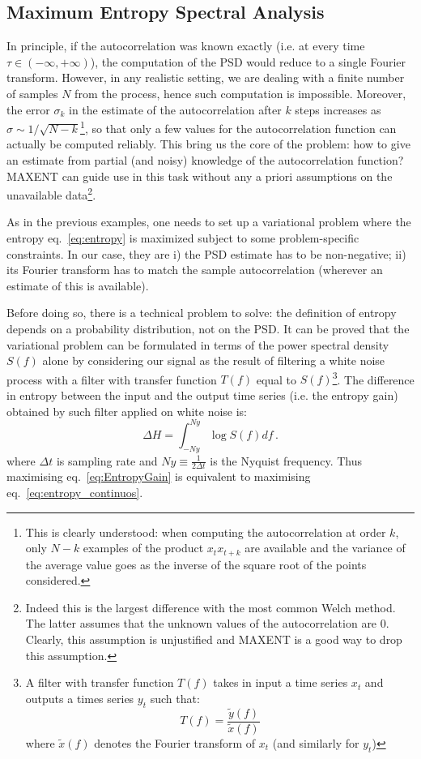 \documentclass[twocolumn,showpacs,preprintnumbers,nofootinbib,prd,
superscriptaddress,10pt]{revtex4-1}
\begin{document}
\subsection{Maximum Entropy Spectral Analysis} \label{sec:MESA}

In principle, if the autocorrelation was known exactly (i.e. at every time $\tau \in (-\infty,+\infty)$), the computation of the PSD 
would reduce to a single Fourier transform.
However, in any realistic setting, we are dealing with a finite number of samples $N$ from the process, hence such computation
is impossible.
Moreover, the error $\sigma_k$ in the estimate of the autocorrelation after $k$ steps increases as $\sigma \sim 1/\sqrt{N - k}$\footnote{
This is clearly understood: when computing the autocorrelation at order $k$, only $N-k$ examples of the product $x_t x_{t+k}$ are available and the variance of the average value goes as the inverse of the square root of the points considered.
}, so that only a few values for the autocorrelation function can actually be computed reliably.
This bring us the core of the problem: how to give an estimate from partial (and noisy) knowledge of the autocorrelation function? MAXENT can guide use in this task without any a priori assumptions on the unavailable data\footnote{Indeed this is the largest difference with the most common Welch method. The latter assumes that the unknown values of the autocorrelation are $0$. Clearly, this assumption is unjustified and MAXENT is a good way to drop this assumption.}.

As in the previous examples, one needs to set up a variational problem where the entropy eq.~\eqref{eq:entropy} is maximized 
subject to some problem-specific constraints. 
In our case, they are i) the PSD estimate has to be non-negative; ii) its Fourier transform has to match the sample autocorrelation (wherever an estimate of this is available).

Before doing so, there is a technical problem to solve: the definition of entropy depends on a probability distribution, not on the PSD.
It can be proved \cite{AblesMESA, Bartlett} that the variational problem can be formulated in terms of the power spectral density $S(f)$ alone by considering our signal as the result of filtering a white noise process with a filter with transfer function $T(f)$ equal to $S(f)$\footnote{
A filter with transfer function $T(f)$ takes in input a time series $x_t$ and outputs a times series $y_t$ such that:
$$T(f) = \frac{\tilde{y}(f)}{\tilde{x}(f)}$$
where $\tilde{x}(f)$ denotes the Fourier transform of $x_t$ (and similarly for $y_t$)
}.
The difference in entropy between the input and the output time series (i.e. the entropy gain) obtained by such filter applied on white noise is:
\begin{equation}\label{eq:EntropyGain}
    \Delta H = \int_{- Ny}^{Ny}\log S(f) df\,.
\end{equation}
where $\Delta t$ is sampling rate and $Ny \equiv \frac{1}{2 \Delta t}$  is the Nyquist frequency.
Thus maximising eq.~\eqref{eq:EntropyGain} is equivalent to maximising eq.~\eqref{eq:entropy_continuos}.
\end{document}
